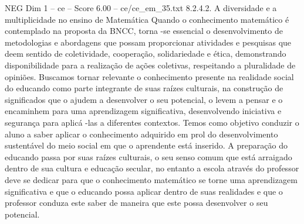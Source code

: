 \begin{textsample}{NEG Dim 1 – ce – Score 6.00 – ce/ce\_em\_35.txt}  \label{ex:f1_neg_245}
8.2.4.2.
A diversidade e a multiplicidade no ensino de Matemática Quando o conhecimento matemático é contemplado na proposta da BNCC, torna -se essencial o desenvolvimento de metodologias e abordagens que possam proporcionar atividades e pesquisas que deem sentido de coletividade, cooperação, solidariedade e ética, demonstrando disponibilidade para a realização de ações coletivas, respeitando a pluralidade de opiniões.
Buscamos tornar relevante o conhecimento presente na realidade social do educando como parte integrante de suas raízes culturais, na construção de significados que o ajudem a desenvolver o seu potencial, o levem a pensar e o encaminhem para uma aprendizagem significativa, desenvolvendo iniciativa e segurança para aplicá -las a diferentes contextos.
Temos como objetivo conduzir o aluno a saber aplicar o conhecimento adquirido em prol do desenvolvimento sustentável do meio social em que o aprendente está inserido.
A preparação do educando passa por suas raízes culturais, o seu senso comum que está arraigado dentro de sua cultura e educação secular, no entanto a escola através do professor deve se dedicar para que o conhecimento matemático se torne uma aprendizagem significativa e que o educando possa aplicar dentro de suas realidades e que o professor conduza este saber de maneira que este possa desenvolver o seu potencial.

\end{textsample}

